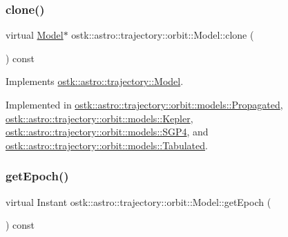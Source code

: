 \mbox{\label{classostk_1_1astro_1_1trajectory_1_1orbit_1_1_model_a53dc07564e4c7c444da46360aa8ada15}} 
\subsubsection{\texorpdfstring{clone()}{clone()}}
{\footnotesize\ttfamily virtual \hyperlink{classostk_1_1astro_1_1trajectory_1_1orbit_1_1_model}{Model}$\ast$ ostk\+::astro\+::trajectory\+::orbit\+::\+Model\+::clone (\begin{DoxyParamCaption}{ }\end{DoxyParamCaption}) const\hspace{0.3cm}{\ttfamily [pure virtual]}}



Implements \hyperlink{classostk_1_1astro_1_1trajectory_1_1_model_ad9f1467f711b07796ddc1437fb9ad9df}{ostk\+::astro\+::trajectory\+::\+Model}.



Implemented in \hyperlink{classostk_1_1astro_1_1trajectory_1_1orbit_1_1models_1_1_propagated_a283639d985495c05adb9e80edb91cd12}{ostk\+::astro\+::trajectory\+::orbit\+::models\+::\+Propagated}, \hyperlink{classostk_1_1astro_1_1trajectory_1_1orbit_1_1models_1_1_kepler_afb76b3571c73fb5c87129033f7d66520}{ostk\+::astro\+::trajectory\+::orbit\+::models\+::\+Kepler}, \hyperlink{classostk_1_1astro_1_1trajectory_1_1orbit_1_1models_1_1_s_g_p4_afb9928e09d66c13a77eb1126da6139eb}{ostk\+::astro\+::trajectory\+::orbit\+::models\+::\+S\+G\+P4}, and \hyperlink{classostk_1_1astro_1_1trajectory_1_1orbit_1_1models_1_1_tabulated_a53603727c33f9ff8db520831cf666142}{ostk\+::astro\+::trajectory\+::orbit\+::models\+::\+Tabulated}.

\mbox{\label{classostk_1_1astro_1_1trajectory_1_1orbit_1_1_model_a22055d5ab4c22e6177a3ddb8f45f1f9b}} 
\subsubsection{\texorpdfstring{get\+Epoch()}{getEpoch()}}
{\footnotesize\ttfamily virtual Instant ostk\+::astro\+::trajectory\+::orbit\+::\+Model\+::get\+Epoch (\begin{DoxyParamCaption}{ }\end{DoxyParamCaption}) const\hspace{0.3cm}{\ttfamily [pure virtual]}}



